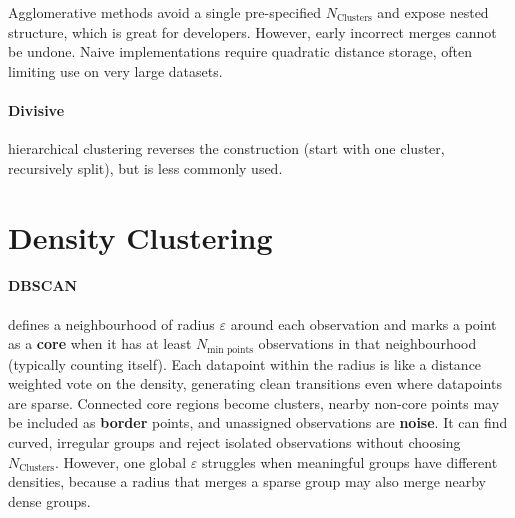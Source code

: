 Agglomerative methods avoid a single pre-specified $N_{\text{Clusters}}$ and expose nested structure, which is great for developers.
However, early incorrect merges cannot be undone.
Naive implementations require quadratic distance storage, often limiting use on very large datasets.
\paragraph{Divisive} hierarchical clustering reverses the construction (start with one cluster, recursively split), but is less commonly used.

\begin{center}
    \begin{minipage}{\linewidth}\centering
    \label{fig:dendrogram}
    \end{minipage}
\end{center}


\section{Density Clustering}
\label{sec:density-clustering}
\paragraph{DBSCAN} defines a neighbourhood of radius $\varepsilon$ around each observation and marks a point as a \textbf{core} when it has at least $N_{\text{min points}}$ observations in that neighbourhood (typically counting itself).
Each datapoint within the radius is like a distance weighted vote on the density, generating clean transitions even where datapoints are sparse.
Connected core regions become clusters, nearby non-core points may be included as \textbf{border} points, and unassigned observations are \textbf{noise}.
It can find curved, irregular groups and reject isolated observations without choosing $N_{\text{Clusters}}$.
However, one global $\varepsilon$ struggles when meaningful groups have different densities, because a radius that merges a sparse group may also merge nearby dense groups.

